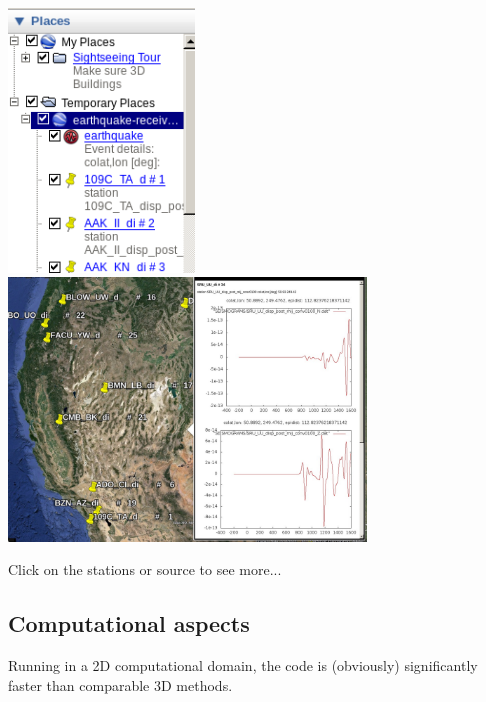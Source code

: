 \documentclass{article}
\begin{document}
\begin{enumerate}
    \begin{center}
    \includegraphics[height=70mm]{google-earth.png}
    \hspace{5mm}
    \includegraphics[height=70mm]{google-earth2.jpg}
    \end{center}

    Click on the stations or source to see more...

\end{enumerate}

\subsection{Computational aspects}

Running in a 2D computational domain, the code is (obviously) significantly faster
than comparable 3D methods. 
\end{document}
